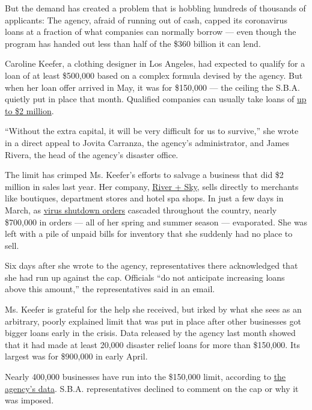 But the demand has created a problem that is hobbling hundreds of
thousands of applicants: The agency, afraid of running out of cash,
capped its coronavirus loans at a fraction of what companies can
normally borrow --- even though the program has handed out less than
half of the \$360 billion it can lend.

Caroline Keefer, a clothing designer in Los Angeles, had expected to
qualify for a loan of at least \$500,000 based on a complex formula
devised by the agency. But when her loan offer arrived in May, it was
for \$150,000 --- the ceiling the S.B.A. quietly put in place that
month. Qualified companies can usually take loans of
\href{https://www.sba.gov/about-sba/sba-newsroom/press-releases-media-advisories/sba-provide-disaster-assistance-loans-small-businesses-impacted-coronavirus-covid-19}{up
to \$2 million}.

``Without the extra capital, it will be very difficult for us to
survive,'' she wrote in a direct appeal to Jovita Carranza, the agency's
administrator, and James Rivera, the head of the agency's disaster
office.

The limit has crimped Ms. Keefer's efforts to salvage a business that
did \$2 million in sales last year. Her company,
\href{https://www.riverandskycalifornia.com/}{River + Sky}, sells
directly to merchants like boutiques, department stores and hotel spa
shops. In just a few days in March, as
\href{https://www.nytimes.com/interactive/2020/us/states-reopen-map-coronavirus.html}{virus
shutdown orders} cascaded throughout the country, nearly \$700,000 in
orders --- all of her spring and summer season --- evaporated. She was
left with a pile of unpaid bills for inventory that she suddenly had no
place to sell.

Six days after she wrote to the agency, representatives there
acknowledged that she had run up against the cap. Officials ``do not
anticipate increasing loans above this amount,'' the representatives
said in an email.

Ms. Keefer is grateful for the help she received, but irked by what she
sees as an arbitrary, poorly explained limit that was put in place after
other businesses got bigger loans early in the crisis. Data released by
the agency last month showed that it had made at least 20,000 disaster
relief loans for more than \$150,000. Its largest was for \$900,000 in
early April.

Nearly 400,000 businesses have run into the \$150,000 limit, according
to
\href{https://www.sba.gov/funding-programs/loans/coronavirus-relief-options/economic-injury-disaster-loans\#section-header-5}{the
agency's data}. S.B.A. representatives declined to comment on the cap or
why it was imposed.

